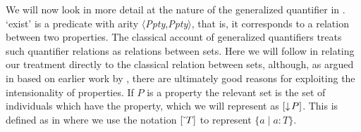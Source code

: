 We will now look in more detail at the nature of the generalized
quantifier in .  `exist' is a predicate with arity
$\langle$\textit{Ppty},\textit{Ppty}$\rangle$, that is, it corresponds
to a relation between two properties.  The classical account of
generalized quantifiers \citep[][and much other
literature]{BarwiseCooper1981,PetersWesterstahl2006} treats such
quantifier relations as relations between sets.  Here we will follow
\cite{Cooper2011,Cooper2013} in relating our treatment directly to the
classical relation between sets, although, as argued in
\cite{Cooper2012a} based on earlier work by \cite{KeenanStavi1986}, there are ultimately good reasons for exploiting
the intensionality of properties.   If $P$ is a property the relevant
set is the set of individuals which have the property, which we will
represent as $[\downarrow\!P]$.  This is defined as in \nexteg{} where
we use the notation $[\ \!\check{}\ \!T]$ to represent $\{a\mid a:T\}$.\label{pg:type-extension}

